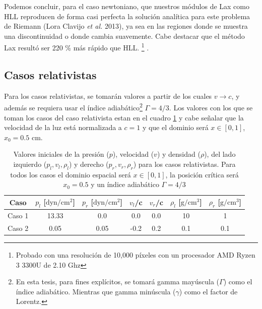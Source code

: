 \documentclass[12pt,a4paper]{book}
\begin{document}

Podemos concluir, para el caso newtoniano, que nuestros módulos de 
Lax como HLL reproducen de forma casi perfecta la solución analítica para este 
problema de Riemann
(Lora Clavijo \emph{et al.} 2013), ya sea en las regiones donde se muestra una discontinuidad
o donde cambia suavemente. 
Cabe destacar que el método Lax resultó ser 220 \% más rápido que HLL. 
\footnote{Probado con una resolución de 10,000 píxeles con un procesador AMD Ryzen 3 3300U de
2.10 Ghz} 
.



\subsection{Casos relativistas}

Para los casos relativistas, se tomarán valores a partir de los cuales $v \rightarrow c$,
y además se requiera usar el índice adiabático\footnote{En esta tesis,
para fines explícitos, se tomará gamma mayúscula ($\Gamma$) como el índice adiabático. Mientras que 
gamma minúscula ($\gamma$) como el factor de Lorentz.} $\Gamma = 4/3$. Los valores con los que se 
toman los casos del caso relativista estan en el cuadro \ref{Cuadro_parametros_sod_tube_rel} y 
cabe señalar que la velocidad de la luz está normalizada a $c = 1$  y que el dominio
será $x \in [0,1]$, $x_0 = 0.5$ cm.

\begin{table}[htbp]
  \begin{center}
  \begin{tabular}{|c|c|c|c|c|c|c|}
  \hline 
  \textbf{Caso} & \textbf{$p_l$} [$\text{dyn}/\text{cm}^2$] & \textbf{$p_r$} [$\text{dyn}/\text{cm}^2$] & \textbf{$v_l$}/c & \textbf{$v_r$}/c  & \textbf{$\rho_l$} [$\text{g}/\text{cm}^3$]& \textbf{$\rho_r$} [$\text{g}/\text{cm}^3$]\\ 
  \hline 
  Caso 1 & 13.33  & 0.0  & 0.0 & 0.0 & 10  & 1 \\ 
  \hline 
  Caso 2 & 0.05  & 0.05  & -0.2 & 0.2 & 0.1  & 0.1  \\ 
  \hline 
  \end{tabular}
  \caption{\label{Cuadro_parametros_sod_tube_rel} Valores iniciales 
  de la presión ($p$), velocidad ($v$)
  y densidad ($\rho$), del lado izquierdo ($p_l, v_l, \rho_l$) y derecho ($p_r, v_r, \rho_r$)
  para los casos relativistas. Para todos los
  casos el dominio espacial será $x \in [0,1]$, la 
  posición crítica será $x_0 = 0.5$ y un índice adiabático $\Gamma = 4/3$}
  \end{center}
\end{table}
\end{document}
